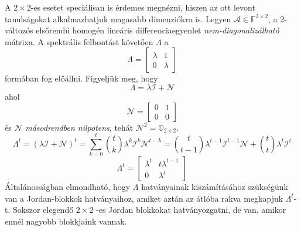 \documentclass[14p]{article}
\begin{document}
A $2 \times 2$-es esetet speciálisan is érdemes megnézni, hiszen az ott levont tanulságokat alkalmazhatjuk magasabb dimenziókra is.
Legyen $\mathcal{A} \in \mathbb{F}^{2 \times 2}$, a 2-változós elsőrendű homogén lineáris differenciaegyenlet \emph{nem-diagonalizálható} mátrixa. A spektrális felbontást követően $\Lambda$ a 
\[
		\Lambda =
		\begin{bmatrix}
		\lambda & 1 \\
		0 & \lambda
		\end{bmatrix}
\]
formában fog előállni\footnotemark{}. Figyeljük meg, hogy
\[
	\Lambda = \lambda\mathcal{I} + \mathcal{N} 
\]
ahol
\[
	\mathcal{N} =
		\begin{bmatrix}
		0 & 1 \\
		0 & 0
		\end{bmatrix}
\]
és $\mathcal{N}$ \emph{másodrendben nilpotens}, tehát $\mathcal{N}^2 = \mathbb{O}_{2 \times 2}$.
\[
	\Lambda^t = (\lambda\mathcal{I} + \mathcal{N})^t = \sum_{k=0}^{t}{t \choose k}\lambda^k\mathcal{I}^k\mathcal{N}^{t-k} = {t \choose t-1} \lambda^{t-1}\mathcal{I}^{t-1}\mathcal{N} + {t \choose t}\lambda^t\mathcal{I}^{t} 
\]
\[
	\Lambda^t = 
		\begin{bmatrix}
		\lambda^t & t\lambda^{t-1} \\
		0 & \lambda^t
		\end{bmatrix}
\]
Általánosságban elmondható, hogy $\Lambda$ hatványainak kiszámításához szükségünk van a Jordan-blokkok hatványaihoz, amiket aztán az átlóba rakva megkapjuk $\Lambda^t$-t. Sokszor elegendő $2 \times 2$ -es Jordan blokkokat hatványozgatni, de van, amikor ennél nagyobb blokkjaink vannak. 

\hrulefill
\end{document}
